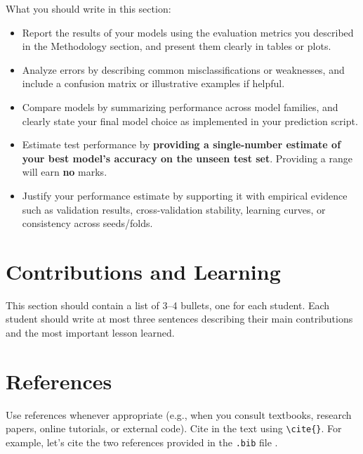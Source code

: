 \documentclass[12pt]{article}
\begin{document}
What you should write in this section:
\begin{itemize}
  \item Report the results of your models using the evaluation metrics you described in the Methodology section, and present them clearly in tables or plots.  
  \item Analyze errors by describing common misclassifications or weaknesses, and include a confusion matrix or illustrative examples if helpful.  
  \item Compare models by summarizing performance across model families, and clearly state your final model choice as implemented in your prediction script.  
  \item Estimate test performance by \textbf{providing a single-number estimate of your best model’s accuracy on the unseen test set}. Providing a range will earn \textbf{no} marks.  
  \item Justify your performance estimate by supporting it with empirical evidence such as validation results, cross-validation stability, learning curves, or consistency across seeds/folds.  
\end{itemize}

\section{Contributions and Learning}

This section should contain a list of 3–4 bullets, one for each student. Each student should write at most three sentences describing their main contributions and the most important lesson learned.

\section{References}

Use references whenever appropriate (e.g., when you consult textbooks, research papers, online tutorials, or external code). Cite in the text using \verb|\cite{}|. For example, let's cite the two references provided in the \texttt{.bib} file \cite{bishop2006prml,hastie2009esl}.



\end{document}
